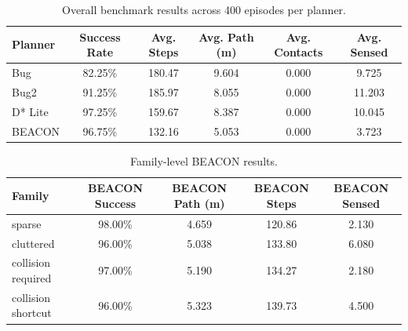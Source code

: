 \begin{table}[t]
\centering
\caption{Overall benchmark results across 400 episodes per planner.}
\label{tab:overall_results}
\begin{tabular}{lccccc}
\toprule
Planner & Success Rate & Avg. Steps & Avg. Path (m) & Avg. Contacts & Avg. Sensed \\
\midrule
Bug & 82.25\% & 180.47 & 9.604 & 0.000 & 9.725 \\
Bug2 & 91.25\% & 185.97 & 8.055 & 0.000 & 11.203 \\
D* Lite & 97.25\% & 159.67 & 8.387 & 0.000 & 10.045 \\
BEACON & 96.75\% & 132.16 & 5.053 & 0.000 & 3.723 \\
\bottomrule
\end{tabular}
\end{table}

\begin{table}[t]
\centering
\caption{Family-level BEACON results.}
\label{tab:family_results}
\begin{tabular}{lcccc}
\toprule
Family & BEACON Success & BEACON Path (m) & BEACON Steps & BEACON Sensed \\
\midrule
sparse & 98.00\% & 4.659 & 120.86 & 2.130 \\
cluttered & 96.00\% & 5.038 & 133.80 & 6.080 \\
collision required & 97.00\% & 5.190 & 134.27 & 2.180 \\
collision shortcut & 96.00\% & 5.323 & 139.73 & 4.500 \\
\bottomrule
\end{tabular}
\end{table}
